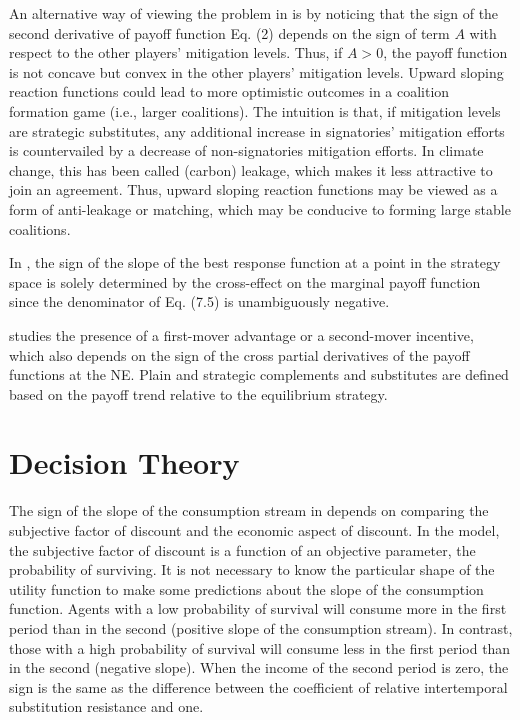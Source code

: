 \documentclass[11pt]{book}
\begin{document}
An alternative way of viewing the problem in \cite{bayramoglu2018climate}
is by noticing that the sign of the second derivative of payoff function
Eq. (2) depends on the sign of term $A$ with respect to the other players'
mitigation levels. Thus, if $A>0$, the payoff function is not concave
but convex in the other players' mitigation levels. Upward sloping reaction
functions could lead to more optimistic outcomes in a coalition formation
game (i.e., larger coalitions). The intuition is that, if mitigation
levels are strategic substitutes, any additional increase in signatories'
mitigation efforts is countervailed by a decrease of non-signatories
mitigation efforts. In climate change, this has been called (carbon)
leakage, which makes it less attractive to join an agreement. Thus,
upward sloping reaction functions may be viewed as a form of anti-leakage
or matching, which may be conducive to forming large stable coalitions.

In \cite{corchon2018handbook}, the sign of the slope of the best
response function at a point in the strategy space is solely determined
by the cross-effect on the marginal payoff function since the denominator
of Eq. (7.5) is unambiguously negative.

\cite{hoffmann2020endogenous} studies the presence of a first-mover
advantage or a second-mover incentive, which also depends on the sign
of the cross partial derivatives of the payoff functions at the NE. Plain and strategic complements and substitutes are defined
based on the payoff trend relative to the equilibrium strategy.


\section{Decision Theory}

The sign of the slope of the consumption stream in \cite{drouhin2001lifetime}
depends on comparing the subjective factor of discount and the economic
aspect of discount. In the model, the subjective factor of discount
is a function of an objective parameter, the probability of surviving.
It is not necessary to know the particular shape of the utility function
to make some predictions about the slope of the consumption function.
Agents with a low probability of survival will consume more in the
first period than in the second (positive slope of the consumption
stream). In contrast, those with a high probability of survival will
consume less in the first period than in the second (negative slope).
When the income of the
second period is zero, the sign is the same as the difference between
the coefficient of relative intertemporal substitution resistance
and one.
\end{document}
